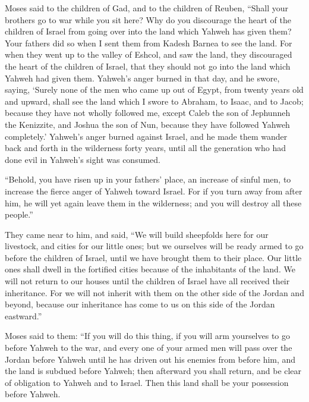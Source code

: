  Moses said to the children of Gad, and to the children of
Reuben, ``Shall your brothers go to war while you sit here? 
Why do you discourage the heart of the children of Israel from going
over into the land which Yahweh has given them?  Your
fathers did so when I sent them from Kadesh Barnea to see the land.
 For when they went up to the valley of Eshcol, and saw the
land, they discouraged the heart of the children of Israel, that they
should not go into the land which Yahweh had given them. 
Yahweh's anger burned in that day, and he swore, saying, 
`Surely none of the men who came up out of Egypt, from twenty years old
and upward, shall see the land which I swore to Abraham, to Isaac, and
to Jacob; because they have not wholly followed me,  except
Caleb the son of Jephunneh the Kenizzite, and Joshua the son of Nun,
because they have followed Yahweh completely.'  Yahweh's
anger burned against Israel, and he made them wander back and forth in
the wilderness forty years, until all the generation who had done evil
in Yahweh's sight was consumed.

 ``Behold, you have risen up in your fathers' place, an
increase of sinful men, to increase the fierce anger of Yahweh toward
Israel.  For if you turn away from after him, he will yet
again leave them in the wilderness; and you will destroy all these
people.''

 They came near to him, and said, ``We will build
sheepfolds here for our livestock, and cities for our little ones;
 but we ourselves will be ready armed to go before the
children of Israel, until we have brought them to their place. Our
little ones shall dwell in the fortified cities because of the
inhabitants of the land.  We will not return to our houses
until the children of Israel have all received their inheritance.
 For we will not inherit with them on the other side of the
Jordan and beyond, because our inheritance has come to us on this side
of the Jordan eastward.''

 Moses said to them: ``If you will do this thing, if you
will arm yourselves to go before Yahweh to the war,  and
every one of your armed men will pass over the Jordan before Yahweh
until he has driven out his enemies from before him,  and
the land is subdued before Yahweh; then afterward you shall return, and
be clear of obligation to Yahweh and to Israel. Then this land shall be
your possession before Yahweh.

